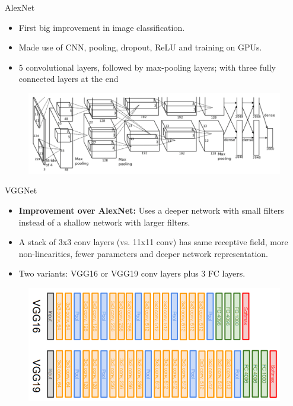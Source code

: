 \documentclass[10pt]{beamer}
\theoremstyle{remark}
\theoremstyle{definition}
\begin{document}
\begin{frame}{AlexNet}
\begin{itemize}
    \item First big improvement in image classification.
    \item Made use of CNN, pooling, dropout, ReLU and training on GPUs.
    \item 5 convolutional layers, followed by max-pooling layers; with three fully connected layers at the end

\end{itemize}

\begin{figure}
\centering
\includegraphics[width=1.0\textwidth,height=0.5\textheight,keepaspectratio]{./images/alexnet.png}
\end{figure}
    
\end{frame}

\begin{frame}{VGGNet}
\begin{itemize}
    \item \textbf{Improvement over AlexNet:} Uses a deeper network with small filters instead of a shallow network with larger filters.
    \item A stack of 3x3 conv layers (vs. 11x11 conv) has same receptive field, more non-linearities, fewer parameters and deeper network representation.
    \item Two variants: VGG16 or VGG19 conv layers plus 3 FC layers.
\end{itemize}

\begin{figure}
\centering
\includegraphics[width=1.0\textwidth,height=0.5\textheight,keepaspectratio]{./images/VGG_16_19.png}
\end{figure}
    
\end{frame}
\end{document}
